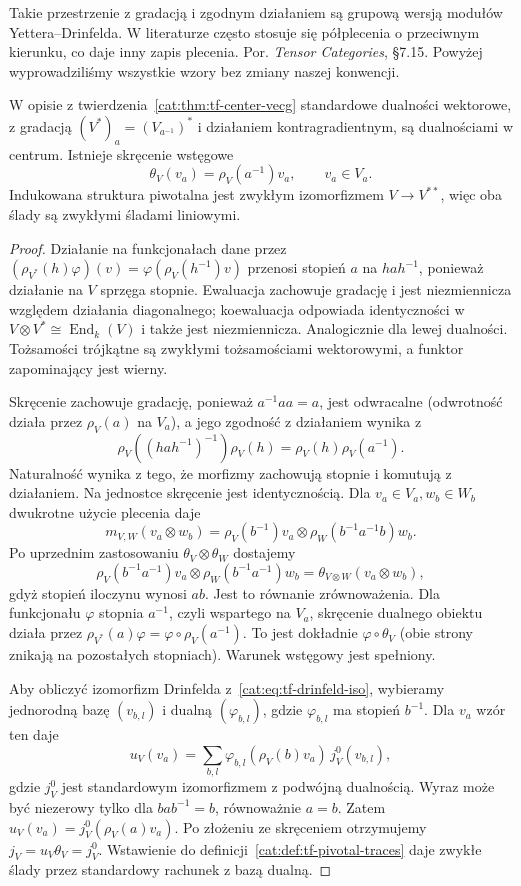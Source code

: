 Takie przestrzenie z gradacją i zgodnym działaniem są grupową wersją modułów Yettera--Drinfelda. W literaturze często stosuje się półplecenia o przeciwnym kierunku, co daje inny zapis plecenia. Por. \emph{Tensor Categories}, \S7.15. Powyżej wyprowadziliśmy wszystkie wzory bez zmiany naszej konwencji.

\begin{stwierdzenie}\label{cat:prop:tf-group-center-twist}
W opisie z twierdzenia~\ref{cat:thm:tf-center-vecg} standardowe dualności wektorowe, z gradacją $(V^*)_a=(V_{a^{-1}})^*$ i działaniem kontragradientnym, są dualnościami w centrum. Istnieje skręcenie wstęgowe
\[
 \theta_V(v_a)=\rho_V(a^{-1})v_a,\qquad v_a\in V_a.
\]
Indukowana struktura piwotalna jest zwykłym izomorfizmem $V\to V^{**}$, więc oba ślady są zwykłymi śladami liniowymi.
\end{stwierdzenie}
\begin{proof}
Działanie na funkcjonałach dane przez $(\rho_{V^*}(h)\varphi)(v)=\varphi(\rho_V(h^{-1})v)$ przenosi stopień $a$ na $hah^{-1}$, ponieważ działanie na $V$ sprzęga stopnie. Ewaluacja zachowuje gradację i jest niezmiennicza względem działania diagonalnego; koewaluacja odpowiada identyczności w $V\otimes V^*\cong\operatorname{End}_k(V)$ i także jest niezmiennicza. Analogicznie dla lewej dualności. Tożsamości trójkątne są zwykłymi tożsamościami wektorowymi, a funktor zapominający jest wierny.

Skręcenie zachowuje gradację, ponieważ $a^{-1}aa=a$, jest odwracalne (odwrotność działa przez $\rho_V(a)$ na $V_a$), a jego zgodność z działaniem wynika z
\[
 \rho_V((hah^{-1})^{-1})\rho_V(h)=\rho_V(h)\rho_V(a^{-1}).
\]
Naturalność wynika z tego, że morfizmy zachowują stopnie i komutują z działaniem. Na jednostce skręcenie jest identycznością. Dla $v_a\in V_a,w_b\in W_b$ dwukrotne użycie plecenia daje
\[
 m_{V,W}(v_a\otimes w_b)
 =\rho_V(b^{-1})v_a\otimes\rho_W(b^{-1}a^{-1}b)w_b.
\]
Po uprzednim zastosowaniu $\theta_V\otimes\theta_W$ dostajemy
\[
 \rho_V(b^{-1}a^{-1})v_a\otimes\rho_W(b^{-1}a^{-1})w_b
 =\theta_{V\otimes W}(v_a\otimes w_b),
\]
gdyż stopień iloczynu wynosi $ab$. Jest to równanie zrównoważenia. Dla funkcjonału $\varphi$ stopnia $a^{-1}$, czyli wspartego na $V_a$, skręcenie dualnego obiektu działa przez $\rho_{V^*}(a)\varphi=\varphi\circ\rho_V(a^{-1})$. To jest dokładnie $\varphi\circ\theta_V$ (obie strony znikają na pozostałych stopniach). Warunek wstęgowy jest spełniony.

Aby obliczyć izomorfizm Drinfelda z~\eqref{cat:eq:tf-drinfeld-iso}, wybieramy jednorodną bazę $(v_{b,l})$ i dualną $(\varphi_{b,l})$, gdzie $\varphi_{b,l}$ ma stopień $b^{-1}$. Dla $v_a$ wzór ten daje
\[
 u_V(v_a)=\sum_{b,l}\varphi_{b,l}(\rho_V(b)v_a)\,j^0_V(v_{b,l}),
\]
gdzie $j^0_V$ jest standardowym izomorfizmem z podwójną dualnością. Wyraz może być niezerowy tylko dla $bab^{-1}=b$, równoważnie $a=b$. Zatem $u_V(v_a)=j^0_V(\rho_V(a)v_a)$. Po złożeniu ze skręceniem otrzymujemy $j_V=u_V\theta_V=j^0_V$. Wstawienie do definicji~\ref{cat:def:tf-pivotal-traces} daje zwykłe ślady przez standardowy rachunek z bazą dualną.
\end{proof}

